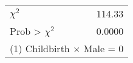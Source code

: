\begin{tabular}{lr}
\toprule
$\chi^2$ &    114.33 \\
Prob > $\chi^2$ &    0.0000 \\
\bottomrule
\multicolumn{2}{l}{\footnotesize (1) Childbirth $\times$ Male = 0}\\
\end{tabular}
